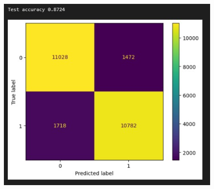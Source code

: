 \documentclass{article}
\begin{document}
\begin{figure}[!h]
    \centering\includegraphics[scale=.70]{./test-LSTM-[16]}
    \caption{}\label{fig.43}
\end{figure}
\end{document}
